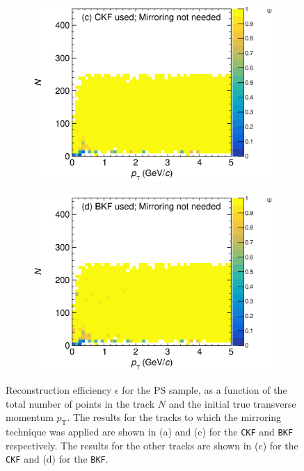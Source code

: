 \begin{figure}[!ht]
          \begin{subfigure}[b]{0.48\textwidth}
         \centering
         \includegraphics[width=\textwidth]{figures/ch5-KF_NDGAr/ToySample/ParScan/testNDGArMirrorEfficiencyVSNPointsVSpT_NoMirror.eps}
         \caption{}
         \label{fig:PS_Eff_CKF_NoMirror}
     \end{subfigure}
     \begin{subfigure}[b]{0.48\textwidth}
         \centering
         \includegraphics[width=\textwidth]{figures/ch5-KF_NDGAr/ToySample/ParScan/testNDGArMirrorEfficiencyVSNPointsVSpT_BKF_NoMirror.eps}
         \caption{}
         \label{fig:PS_Eff_BKF_NoMirror}
     \end{subfigure}
        \caption{ Reconstruction efficiency $\epsilon$ for the PS sample, as a function of the total number of points in the track $N$ and the initial true transverse momentum $p_\textrm{T}$. The results for the tracks to which the mirroring technique was applied are shown in (a) and (c) for the \texttt{CKF} and \texttt{BKF} respectively. The results for the other tracks are shown in (c) for the \texttt{CKF} and (d) for the \texttt{BKF}.} \label{fig:PS_Eff}
\end{figure}


